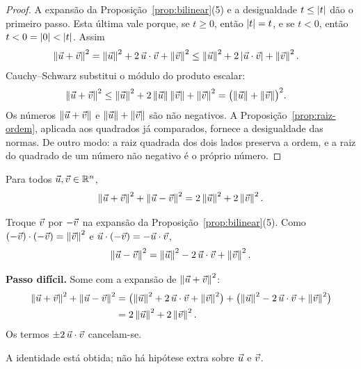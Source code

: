 \documentclass[11pt,a4paper]{article}
\begin{document}
\begin{proof}
A expansão da Proposição~\ref{prop:bilinear}(5) e a desigualdade $t\le\left\lvert t \right\rvert$ dão o primeiro passo. Esta última vale porque, se $t\ge 0$, então $\left\lvert t \right\rvert=t$, e se $t<0$, então $t<0=\left\lvert 0 \right\rvert<\left\lvert t \right\rvert$. Assim
\begin{align*}
\left\lVert \vec{u}+\vec{v} \right\rVert^2
&=\left\lVert \vec{u} \right\rVert^2+2\,\vec{u}\cdot\vec{v}+\left\lVert \vec{v} \right\rVert^2
\le\left\lVert \vec{u} \right\rVert^2+2\left\lvert \vec{u}\cdot\vec{v} \right\rvert+\left\lVert \vec{v} \right\rVert^2.
\end{align*}
Cauchy--Schwarz substitui o módulo do produto escalar:
\begin{align*}
\left\lVert \vec{u}+\vec{v} \right\rVert^2
&\le\left\lVert \vec{u} \right\rVert^2+2\left\lVert \vec{u} \right\rVert\left\lVert \vec{v} \right\rVert+\left\lVert \vec{v} \right\rVert^2
=\bigl(\left\lVert \vec{u} \right\rVert+\left\lVert \vec{v} \right\rVert\bigr)^2.
\end{align*}
Os números $\left\lVert \vec{u}+\vec{v} \right\rVert$ e $\left\lVert \vec{u} \right\rVert+\left\lVert \vec{v} \right\rVert$ são não negativos. A Proposição~\ref{prop:raiz-ordem}, aplicada aos quadrados já comparados, fornece a desigualdade das normas. De outro modo: a raiz quadrada dos dois lados preserva a ordem, e a raiz do quadrado de um número não negativo é o próprio número.
\end{proof}

\begin{lema}\label{lem:paralelogramo}
Para todos $\vec{u},\vec{v}\in\mathbb{R}^n$,
\[
\left\lVert \vec{u}+\vec{v} \right\rVert^2+\left\lVert \vec{u}-\vec{v} \right\rVert^2=2\left\lVert \vec{u} \right\rVert^2+2\left\lVert \vec{v} \right\rVert^2.
\]
\end{lema}

\begin{esqueleto}
\item Troque $\vec{v}$ por $-\vec{v}$ na expansão da Proposição~\ref{prop:bilinear}(5). Como $(-\vec{v})\cdot(-\vec{v})=\left\lVert \vec{v} \right\rVert^2$ e $\vec{u}\cdot(-\vec{v})=-\vec{u}\cdot\vec{v}$,
\[
\left\lVert \vec{u}-\vec{v} \right\rVert^2=\left\lVert \vec{u} \right\rVert^2-2\,\vec{u}\cdot\vec{v}+\left\lVert \vec{v} \right\rVert^2.
\]
\item \textbf{Passo difícil.} Some com a expansão de $\left\lVert \vec{u}+\vec{v} \right\rVert^2$:
\begin{align*}
\left\lVert \vec{u}+\vec{v} \right\rVert^2+\left\lVert \vec{u}-\vec{v} \right\rVert^2
&=\bigl(\left\lVert \vec{u} \right\rVert^2+2\,\vec{u}\cdot\vec{v}+\left\lVert \vec{v} \right\rVert^2\bigr)
+\bigl(\left\lVert \vec{u} \right\rVert^2-2\,\vec{u}\cdot\vec{v}+\left\lVert \vec{v} \right\rVert^2\bigr)\\
&=2\left\lVert \vec{u} \right\rVert^2+2\left\lVert \vec{v} \right\rVert^2.
\end{align*}
Os termos $\pm 2\,\vec{u}\cdot\vec{v}$ cancelam-se.
\item A identidade está obtida; não há hipótese extra sobre $\vec{u}$ e $\vec{v}$.
\end{esqueleto}
\end{document}
